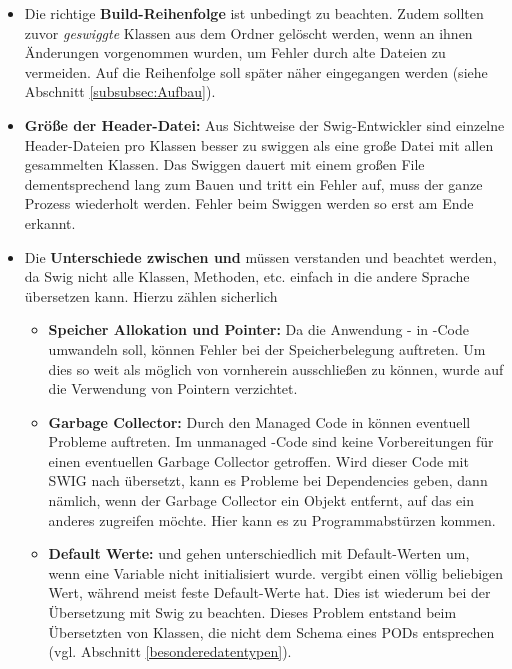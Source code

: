 \begin{itemize}
\item Die richtige \textbf{Build-Reihenfolge} ist unbedingt zu beachten. Zudem sollten zuvor \emph{geswiggte} Klassen aus dem Ordner gelöscht werden, wenn an ihnen Änderungen vorgenommen wurden, um Fehler durch alte Dateien zu vermeiden. Auf die Reihenfolge soll später näher eingegangen werden (siehe Abschnitt \ref{subsubsec:Aufbau}).
\item \textbf{Größe der Header-Datei:} Aus Sichtweise der Swig-Entwickler sind einzelne Header-Dateien pro Klassen besser zu swiggen als eine große Datei mit allen gesammelten Klassen. Das Swiggen dauert mit einem großen File dementsprechend lang zum Bauen und tritt ein Fehler auf, muss der ganze Prozess wiederholt werden. Fehler beim Swiggen werden so erst am Ende erkannt. %
\item Die \textbf{Unterschiede zwischen \CC und \CS} müssen verstanden und beachtet werden, da Swig nicht alle Klassen, Methoden, etc. einfach in die andere Sprache übersetzen kann. Hierzu zählen sicherlich 
	\begin{itemize}
	\item \textbf{Speicher Allokation und Pointer:}
	Da die Anwendung \CC - in \CS -Code umwandeln soll, können Fehler bei der Speicherbelegung auftreten. Um dies so weit als möglich von vornherein ausschließen zu können, wurde auf die Verwendung von Pointern verzichtet.
	\item \textbf{Garbage Collector:} Durch den Managed Code in \CS können eventuell Probleme auftreten. Im unmanaged \CC -Code sind keine Vorbereitungen für einen eventuellen Garbage Collector getroffen. Wird dieser Code mit SWIG nach \CS übersetzt, kann es Probleme bei Dependencies geben, dann nämlich, wenn der Garbage Collector ein Objekt entfernt, auf das ein anderes zugreifen möchte. Hier kann es zu Programmabstürzen kommen.
	\item \textbf{Default Werte:} \CC und \CS gehen unterschiedlich mit Default-Werten um, wenn eine Variable nicht initialisiert wurde. \CC vergibt einen völlig beliebigen Wert, während \CS meist feste Default-Werte hat. Dies ist wiederum bei der Übersetzung mit Swig zu beachten. Dieses Problem entstand beim Übersetzten von Klassen, die nicht dem Schema eines PODs entsprechen (vgl. Abschnitt \ref{besonderedatentypen}).

\end{itemize}
\end{itemize}
